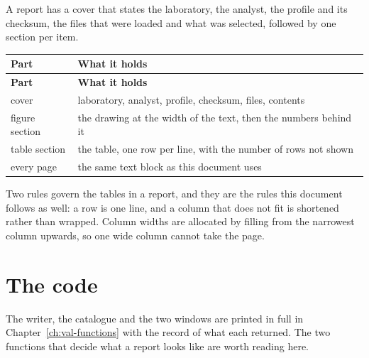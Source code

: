 A report has a cover that states the laboratory, the analyst, the profile and its
checksum, the files that were loaded and what was selected, followed by one
section per item.

{\small
\begin{xltabular}{\linewidth}{|X|l|}
\toprule \textbf{Part} & \textbf{What it holds} \\\midrule\endfirsthead
\toprule \textbf{Part} & \textbf{What it holds} \\\midrule\endhead
cover & laboratory, analyst, profile, checksum, files, contents \\
figure section & the drawing at the width of the text, then the numbers behind it \\
table section & the table, one row per line, with the number of rows not shown \\
every page & the same text block as this document uses \\
\bottomrule
\end{xltabular}}


Two rules govern the tables in a report, and they are the rules this document
follows as well: a row is one line, and a column that does not fit is shortened
rather than wrapped. Column widths are allocated by filling from the narrowest
column upwards, so one wide column cannot take the page.

\section{The code}
The writer, the catalogue and the two windows are printed in full in
Chapter~\ref{ch:val-functions} with the record of what each returned. The two
functions that decide what a report looks like are worth reading here.

